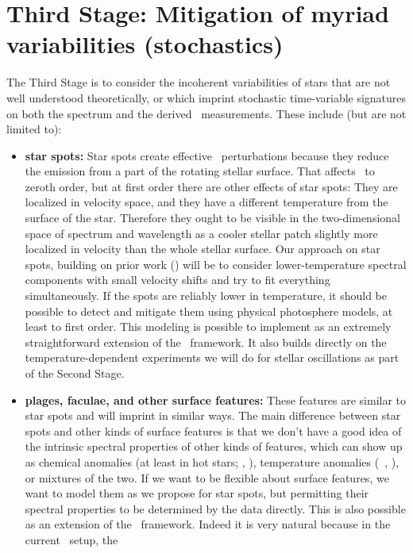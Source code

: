 \documentclass[12pt, letterpaper]{article}
\begin{document}
\section{Third Stage: Mitigation of myriad variabilities (stochastics)}

The Third Stage is to consider the incoherent variabilities of stars
that are not well understood theoretically, or which imprint
stochastic time-variable signatures on both the spectrum and the
derived \RV\ measurements.
These include (but are not limited to):
\begin{itemize}
\item
\textbf{star spots:}
Star spots create effective \RV\ perturbations because they reduce the
emission from a part of the rotating stellar surface.
That affects \EPRV\ to zeroth order, but at first order there are other
effects of star spots:
They are localized in velocity space, and they have a different
temperature from the surface of the star.
Therefore they ought to be visible in the two-dimensional space of
spectrum and wavelength as a cooler stellar patch slightly more
localized in velocity than the whole stellar surface.
Our approach on star spots, building on prior work (\citealt{Gully}) will
be to consider lower-temperature spectral components with small
velocity shifts and try to fit everything simultaneously.
If the spots are reliably lower in temperature, it should be possible
to detect and mitigate them using physical photosphere models, at
least to first order.
This modeling is possible to implement as an extremely straightforward
extension of the \wobble\ framework. 
It also builds directly on the temperature-dependent experiments we will do
for stellar oscillations as part of the Second Stage.
\item
\textbf{plages, faculae, and other surface features:}
These features are similar to star spots and will imprint in similar
ways.
The main difference between star spots and other kinds of surface
features is that we don't have a good idea of the intrinsic spectral
properties of other kinds of features, which can show up as chemical
anomalies (at least in hot stars; \eg, \citealt{doppler}),
temperature anomalies (\eg\ \citealt{Gully}, \citealt{Milbourne2019}),
or mixtures of the two.
If we want to be flexible about surface features, we want to model
them as we propose for star spots, but permitting their spectral
properties to be determined by the data directly.
This is also possible as an extension of the \wobble\ framework.
Indeed it is very natural because in the current \wobble\ setup, the

\end{itemize}
\end{document}
